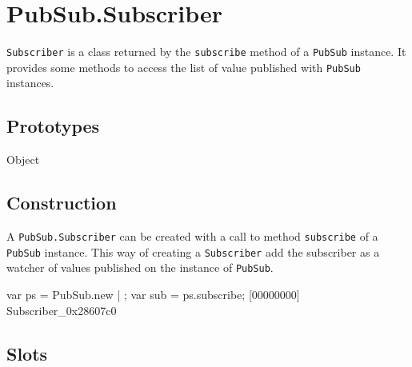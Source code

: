 \section{PubSub.Subscriber}

\lstinline|Subscriber| is a class returned by the \lstinline|subscribe|
method of a \lstinline|PubSub| instance.  It provides some methods to access
the list of value published with \lstinline|PubSub| instances.


\subsection{Prototypes}

\begin{refObjects}
\item[Object]
\end{refObjects}

\subsection{Construction}

A \lstinline|PubSub.Subscriber| can be created with a call to method
\lstinline|subscribe| of a \lstinline|PubSub| instance.  This way of
creating a \lstinline|Subscriber| add the subscriber as a watcher of values
published on the instance of \lstinline|PubSub|.

\begin{urbiscript}[firstnumber=1]
var ps = PubSub.new | {};
var sub = ps.subscribe;
[00000000] Subscriber_0x28607c0
\end{urbiscript}


\subsection{Slots}

